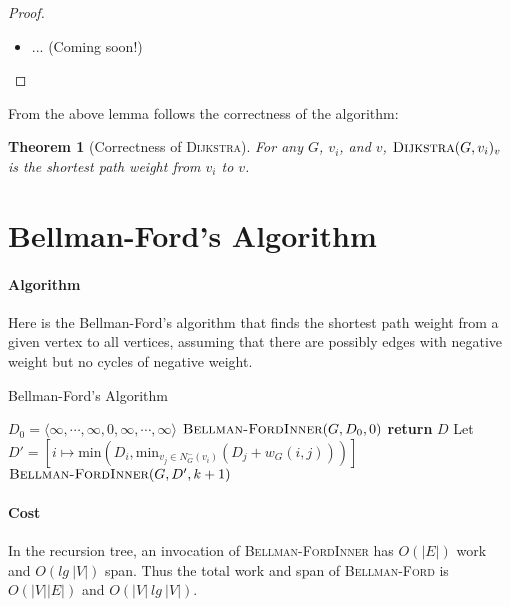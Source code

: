 \documentclass[11pt,a4paper,oneside,microtype,nokorean]{oblivoir}
\newtheorem{theorem}{Theorem}
\begin{document}
\begin{proof}
\begin{itemize}
\begin{itemize}
    \item ... (Coming soon!)
    \end{itemize}
  \end{itemize}
\end{proof}


From the above lemma follows the correctness of the algorithm:

\begin{theorem}[Correctness of \textsc{Dijkstra}] For any $G$, $v_i$, and $v$,
  $\textsc{Dijkstra}(G,v_i)_v$ is the shortest path weight from $v_i$ to $v$.
\end{theorem}



\section{Bellman-Ford's Algorithm}

\paragraph{Algorithm}

Here is the Bellman-Ford's algorithm that finds the shortest path weight from a given vertex to all
vertices, assuming that there are possibly edges with negative weight but no cycles of negative
weight.

\begin{algorithm}
  \caption{Bellman-Ford's Algorithm}\label{dijkstra}
  \begin{algorithmic}[1]
     
    \State $D_0 = \langle \infty, \cdots, \infty, 0, \infty, \cdots, \infty \rangle$ 
    \State $\Call{Bellman-FordInner}{G,D_0,0}$
    \EndProcedure
    \Statex
     
    \State \textbf{return} $D$
    \EndIf
    \State Let $D' = [i \mapsto \textrm{min}(D_i, \textrm{min}_{v_j \in N^-_G(v_i)} (D_j + w_G(i,j)))]$
    \State $\Call{Bellman-FordInner}{G,D',k+1}$
    \EndProcedure
  \end{algorithmic}
\end{algorithm}


\paragraph{Cost}

In the recursion tree, an invocation of \textsc{Bellman-FordInner} has $O(|E|)$ work and $O(lg~|V|)$
span.  Thus the total work and span of \textsc{Bellman-Ford} is $O(|V||E|)$ and $O(|V|~lg~|V|)$.
\end{document}
